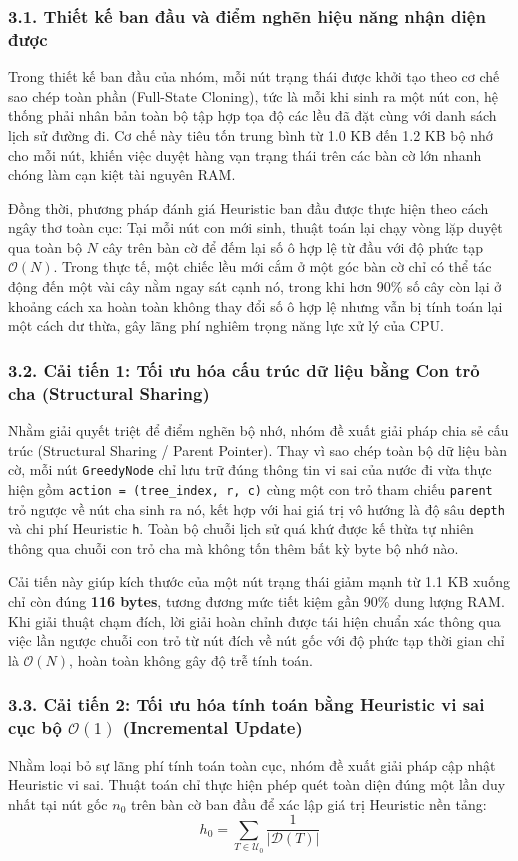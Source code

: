 \documentclass[a4paper,12pt]{article}
\begin{document}
\subsubsection*{3.1. Thiết kế ban đầu và điểm nghẽn hiệu năng nhận diện được}
Trong thiết kế ban đầu của nhóm, mỗi nút trạng thái được khởi tạo theo cơ chế sao chép toàn phần (Full-State Cloning), tức là mỗi khi sinh ra một nút con, hệ thống phải nhân bản toàn bộ tập hợp tọa độ các lều đã đặt cùng với danh sách lịch sử đường đi. Cơ chế này tiêu tốn trung bình từ 1.0 KB đến 1.2 KB bộ nhớ cho mỗi nút, khiến việc duyệt hàng vạn trạng thái trên các bàn cờ lớn nhanh chóng làm cạn kiệt tài nguyên RAM.

Đồng thời, phương pháp đánh giá Heuristic ban đầu được thực hiện theo cách ngây thơ toàn cục: Tại mỗi nút con mới sinh, thuật toán lại chạy vòng lặp duyệt qua toàn bộ $N$ cây trên bàn cờ để đếm lại số ô hợp lệ từ đầu với độ phức tạp $\mathcal{O}(N)$. Trong thực tế, một chiếc lều mới cắm ở một góc bàn cờ chỉ có thể tác động đến một vài cây nằm ngay sát cạnh nó, trong khi hơn 90\% số cây còn lại ở khoảng cách xa hoàn toàn không thay đổi số ô hợp lệ nhưng vẫn bị tính toán lại một cách dư thừa, gây lãng phí nghiêm trọng năng lực xử lý của CPU.

\subsubsection*{3.2. Cải tiến 1: Tối ưu hóa cấu trúc dữ liệu bằng Con trỏ cha (Structural Sharing)}
Nhằm giải quyết triệt để điểm nghẽn bộ nhớ, nhóm đề xuất giải pháp chia sẻ cấu trúc (Structural Sharing / Parent Pointer). Thay vì sao chép toàn bộ dữ liệu bàn cờ, mỗi nút \texttt{GreedyNode} chỉ lưu trữ đúng thông tin vi sai của nước đi vừa thực hiện gồm \texttt{action = (tree\_index, r, c)} cùng một con trỏ tham chiếu \texttt{parent} trỏ ngược về nút cha sinh ra nó, kết hợp với hai giá trị vô hướng là độ sâu \texttt{depth} và chi phí Heuristic \texttt{h}. Toàn bộ chuỗi lịch sử quá khứ được kế thừa tự nhiên thông qua chuỗi con trỏ cha mà không tốn thêm bất kỳ byte bộ nhớ nào.

Cải tiến này giúp kích thước của một nút trạng thái giảm mạnh từ 1.1 KB xuống chỉ còn đúng \textbf{116 bytes}, tương đương mức tiết kiệm gần 90\% dung lượng RAM. Khi giải thuật chạm đích, lời giải hoàn chỉnh được tái hiện chuẩn xác thông qua việc lần ngược chuỗi con trỏ từ nút đích về nút gốc với độ phức tạp thời gian chỉ là $\mathcal{O}(N)$, hoàn toàn không gây độ trễ tính toán.

\subsubsection*{3.3. Cải tiến 2: Tối ưu hóa tính toán bằng Heuristic vi sai cục bộ $\mathcal{O}(1)$ (Incremental Update)}
Nhằm loại bỏ sự lãng phí tính toán toàn cục, nhóm đề xuất giải pháp cập nhật Heuristic vi sai. Thuật toán chỉ thực hiện phép quét toàn diện đúng một lần duy nhất tại nút gốc $n_0$ trên bàn cờ ban đầu để xác lập giá trị Heuristic nền tảng:
\begin{equation}
    h_0 = \sum_{T \in \mathcal{U}_0} \frac{1}{|\mathcal{D}(T)|}
\end{equation}
\end{document}
